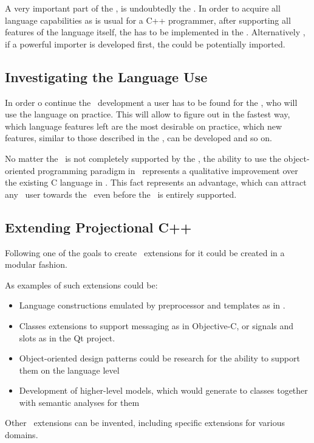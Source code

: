 A very important part of the \cpppl, is undoubtedly  the . In order to acquire
all language capabilities as is usual for a C++ programmer, after supporting all features
of the language itself, the  has to be implemented in the \pcpp. Alternatively , if a powerful
importer is developed first, the  could be potentially imported. 

\subsection{Investigating the Language Use}

In order o continue the \pcpp\ development a user has to be found for the \pcpp, who
will use the language on practice. This will allow to figure out in the fastest way,
which language features left are the most desirable on practice, which new features,
similar to those described in the , can be developed and so on.

No matter the \cpppl\ is not completely supported by the \pcpp, the ability to use the
object-oriented programming paradigm in \mbdr\ represents a qualitative improvement over
the existing C language in \mbdr. This fact represents an advantage, which can
attract any \mbdr\ user towards the \pcpp\ even before the \cpppl\ is entirely supported.

\subsection{Extending Projectional C++}

Following one of the goals to create \pcpp\ extensions for it could be created in a 
modular fashion.

As examples of such extensions could be:
\begin{itemize}
 \item Language constructions emulated by preprocessor and templates as in \cite{alexandrescu}.
 \item Classes extensions to support messaging as in Objective-C, or signals and slots as in the Qt project.
 \item Object-oriented design patterns could be research for the ability to support them on the 
 language level
 \item Development of higher-level models, which would generate to classes together with semantic analyses for them
\end{itemize}

Other \pcpp\ extensions can be invented, including specific extensions for various domains.


